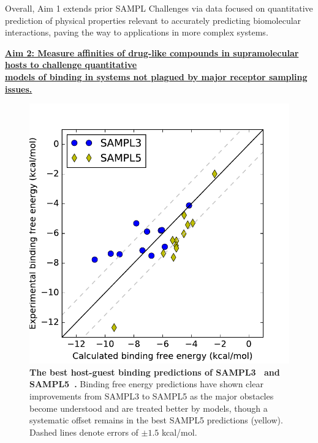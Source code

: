\documentclass[11pt]{article}
\begin{document}
Overall, Aim 1 extends prior SAMPL Challenges via data focused on quantitative prediction of physical properties relevant to accurately predicting biomolecular interactions, paving the way to applications in more complex systems.

\eject

\textbf{\underline{Aim 2: Measure affinities of drug-like compounds in supramolecular hosts to challenge quantitative}}\\
\textbf{\underline{models of binding in systems not plagued by major receptor sampling issues.}}

\begin{figure}
\vspace{-0.23in}
\begin{centering}
\includegraphics[width=\textwidth]{figures/sampl3_and_sampl5.pdf}

\vspace{-0.10in}
\end{centering}
\footnotesize
\caption{\label{figure:hg_sampl}  
\textbf{The best host-guest binding predictions of SAMPL3~\cite{muddana_sampl3_2012} and SAMPL5~\cite{yin_sampl5_2016}.} 
Binding free energy predictions have shown clear improvements from SAMPL3 to SAMPL5 as the major obstacles become understood and are treated better by models, though a systematic offset remains in the best SAMPL5 predictions (yellow). Dashed lines denote errors of $\pm1.5$ kcal/mol.
}
\end{figure}
\end{document}
